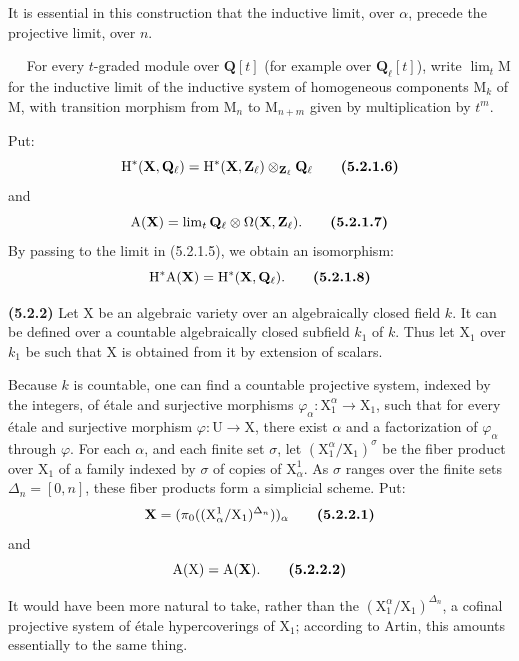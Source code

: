 \documentclass[11pt,leqno]{article}
\newcommand{\Page}[1]{\ifvmode\noindent\else\unskip\ \fi{\footnotesize\textcolor{gray}{[p.\,#1]}}\ \ignorespaces}
\begin{document}
It is essential in this construction that the inductive limit, over \(\alpha\), precede the projective limit, over \(n\).

\Page{238}
For every \(t\)-graded module over \(\mathbf{Q}[t]\) (for example over \(\mathbf{Q}_{\ell}[t]\)), write \(\lim\nolimits_t\mathrm{M}\) for the inductive limit of the inductive system of homogeneous components \(\mathrm{M}_k\) of \(\mathrm{M}\), with transition morphism from \(\mathrm{M}_n\) to \(\mathrm{M}_{n+m}\) given by multiplication by \(t^m\).

Put:
\[
\mathrm{H}^*(\mathbf{X},\mathbf{Q}_{\ell})
=\mathrm{H}^*(\mathbf{X},\mathbf{Z}_{\ell})
\otimes_{\mathbf{Z}_{\ell}}\mathbf{Q}_{\ell}
\tag*{\textbf{(5.2.1.6)}}
\]
and
\[
\mathrm{A}(\mathbf{X})
=\lim\nolimits_t\mathbf{Q}_{\ell}\otimes\Omega(\mathbf{X},\mathbf{Z}_{\ell}).
\tag*{\textbf{(5.2.1.7)}}
\]
By passing to the limit in (5.2.1.5), we obtain an isomorphism:
\[
\mathrm{H}^*\mathrm{A}(\mathbf{X})=\mathrm{H}^*(\mathbf{X},\mathbf{Q}_{\ell}).
\tag*{\textbf{(5.2.1.8)}}
\]

\textbf{(5.2.2)} Let \(\mathrm{X}\) be an algebraic variety over an algebraically closed field \(k\). It can be defined over a countable algebraically closed subfield \(k_1\) of \(k\). Thus let \(\mathrm{X}_1\) over \(k_1\) be such that \(\mathrm{X}\) is obtained from it by extension of scalars.

Because \(k\) is countable, one can find a countable projective system, indexed by the integers, of étale and surjective morphisms \(\varphi_{\alpha}:\mathrm{X}_1^{\alpha}\to\mathrm{X}_1\), such that for every étale and surjective morphism \(\varphi:\mathrm{U}\to\mathrm{X}\), there exist \(\alpha\) and a factorization of \(\varphi_{\alpha}\) through \(\varphi\). For each \(\alpha\), and each finite set \(\sigma\), let \((\mathrm{X}_1^{\alpha}/\mathrm{X}_1)^{\sigma}\) be the fiber product over \(\mathrm{X}_1\) of a family indexed by \(\sigma\) of copies of \(\mathrm{X}_{\alpha}^{1}\). As \(\sigma\) ranges over the finite sets \(\Delta_n=[0,n]\), these fiber products form a simplicial scheme. Put:
\[
\mathbf{X}=(\pi_0((\mathrm{X}_{\alpha}^{1}/\mathrm{X}_1)^{\Delta_n}))_{\alpha}
\tag*{\textbf{(5.2.2.1)}}
\]
and
\[
\mathrm{A}(\mathrm{X})=\mathrm{A}(\mathbf{X}).
\tag*{\textbf{(5.2.2.2)}}
\]

It would have been more natural to take, rather than the \((\mathrm{X}_1^{\alpha}/\mathrm{X}_1)^{\Delta_n}\), a cofinal projective system of étale hypercoverings of \(\mathrm{X}_1\); according to Artin, this amounts essentially to the same thing.
\end{document}
